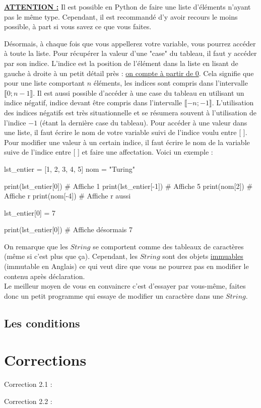 \documentclass[a4paper,12pt]{article}
\begin{document}
{\color{red}
\textbf{\underline{ATTENTION :}} Il est possible en Python de faire une liste d'éléments n'ayant pas le même type. Cependant, il est recommandé d'y avoir recours le moins possible, à part si vous savez ce que vous faites. \newline
}

Désormais, à chaque fois que vous appellerez votre variable, vous pourrez accéder à toute la liste. Pour récupérer la valeur d'une "case" du tableau, il faut y accéder
par son indice. L'indice est la position de l'élément dans la liste en lisant de gauche à droite à un petit détail près : \underline{on compte à partir de 0}. 
Cela signifie que pour une liste comportant $n$ éléments, les indices sont compris dans l'intervalle $\llbracket0;n-1\rrbracket$. Il est aussi possible d'accéder à une 
case du tableau en utilisant un indice négatif, indice devant être compris dans l'intervalle $\llbracket-n;-1\rrbracket$. L'utilisation des indices négatifs est très 
situationnelle et se résumera souvent à l'utilisation de l'indice $-1$ (étant la dernière case du tableau). \newline
Pour accéder à une valeur dans une liste, il faut écrire le nom de votre variable suivi de l'indice voulu entre [ ]. \newline
Pour modifier une valeur à un certain indice, il faut écrire le nom de la variable suive de l'indice entre [ ] et faire une affectation. \newline 
Voici un exemple : 
\begin{pythoncode}
    lst_entier = [1, 2, 3, 4, 5]
    nom = "Turing" 

    print(lst_entier[0]) # Affiche 1
    print(lst_entier[-1]) # Affiche 5 
    print(nom[2]) # Affiche r
    print(nom[-4]) # Affiche r aussi

    lst_entier[0] = 7

    print(lst_entier[0]) # Affiche désormais 7
\end{pythoncode}

{\color{darkgreen}
On remarque que les $String$ se comportent comme des tableaux de caractères (même si c'est plus que ça). Cependant, les $String$ sont des objets \underline{immuables}
(immutable en Anglais) ce qui veut dire que vous ne pourrez pas en modifier le contenu après déclaration. \\
Le meilleur moyen de vous en convaincre c'est d'essayer par vous-même, faites donc un petit programme qui essaye de modifier un caractère dans une $String$.
}

\subsection{Les conditions}

\newpage

\section{Corrections}

\hypertarget{AncreExo2.1}{Correction 2.1 : }
\hypertarget{AncreExo2.2}{Correction 2.2 : }
\end{document}
